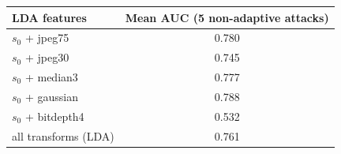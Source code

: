 \begin{tabular}{lc}
\toprule
LDA features & Mean AUC (5 non-adaptive attacks) \\
\midrule
$s_0$ + jpeg75 & 0.780 \\
$s_0$ + jpeg30 & 0.745 \\
$s_0$ + median3 & 0.777 \\
$s_0$ + gaussian & 0.788 \\
$s_0$ + bitdepth4 & 0.532 \\
all transforms (LDA) & 0.761 \\
\bottomrule
\end{tabular}
